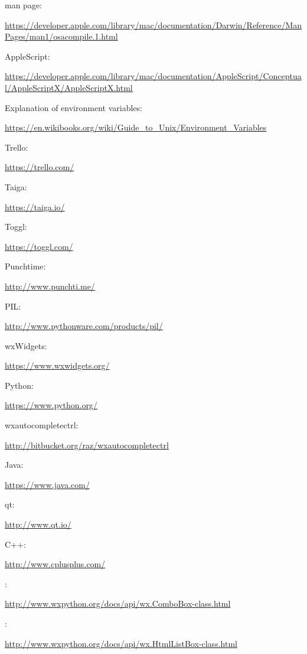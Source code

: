\documentclass[12pt,a4paper,naustrian,english,oneside,openright,DIV=12,BCOR=1cm]{scrbook}
\begin{document}

\begin{thebibliography}{999}
	  man page:
	
	\url{https://developer.apple.com/library/mac/documentation/Darwin/Reference/ManPages/man1/osacompile.1.html}
	
	 AppleScript: 
	
	\url{https://developer.apple.com/library/mac/documentation/AppleScript/Conceptual/AppleScriptX/AppleScriptX.html}
	
	 Explanation of environment variables:  
	
	\url{https://en.wikibooks.org/wiki/Guide_to_Unix/Environment_Variables}
	
	 Trello: 
	 
	\url{https://trello.com/}
	
	 Taiga:  
	
	\url{https://taiga.io/}
	
	 Toggl: 
	 
	\url{https://toggl.com/}
	
	 Punchtime:  
	
	\url{http://www.punchti.me/}
	
	 PIL:  
	
	\url{http://www.pythonware.com/products/pil/}
	
	 wxWidgets:  
	
	\url{https://www.wxwidgets.org/}
	
	 Python:  
	
	\url{https://www.python.org/}
	
	 wxautocompletectrl: 
	 
	\url{http://bitbucket.org/raz/wxautocompletectrl}
	
	 Java:  
	
	\url{https://www.java.com/}
	
	 qt:  
	
	\url{http://www.qt.io/}
	
	 C++: 
	 
	\url{http://www.cplusplus.com/}
	
	 :
	
	\url{http://www.wxpython.org/docs/api/wx.ComboBox-class.html}
	
	 :
	
	\url{http://www.wxpython.org/docs/api/wx.HtmlListBox-class.html}
	
\end{thebibliography}
\end{document}
